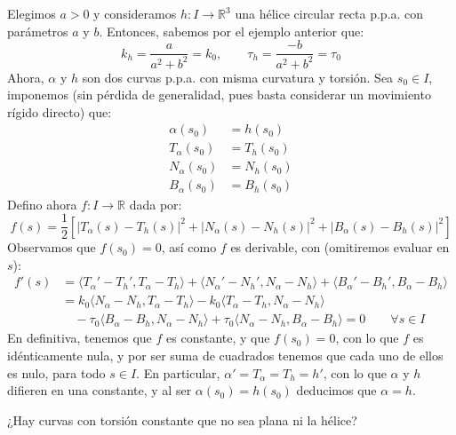 \begin{ejercicio}
    \noindent
    Elegimos $a>0$ y consideramos $h:I\to \mathbb{R}^3$ una hélice circular recta p.p.a. con parámetros $a$ y $b$. Entonces, sabemos por el ejemplo anterior que:
    \begin{equation*}
        k_h = \frac{a}{a^2+b^2} = k_0, \qquad \tau_h = \frac{-b}{a^2+b^2} = \tau_0
    \end{equation*}
    Ahora, $\alpha$ y $h$ son dos curvas p.p.a. con misma curvatura y torsión. Sea $s_0\in I$, imponemos (sin pérdida de generalidad, pues basta considerar un movimiento rígido directo) que:
    \begin{align*}
        \alpha(s_0) &= h(s_0) \\
        T_\alpha(s_0) &= T_h(s_0) \\
        N_\alpha(s_0) &= N_h(s_0) \\
        B_\alpha(s_0) &= B_h(s_0)
    \end{align*}
    Defino ahora $f:I\to \mathbb{R}$ dada por:
    \begin{equation*}
        f(s) = \frac{1}{2}\left[|T_\alpha(s)-T_h(s)|^2 + |N_\alpha(s)-N_h(s)|^2 + |B_\alpha(s)-B_h(s)|^2\right]
    \end{equation*}
    Observamos que $f(s_0) = 0$, así como $f$ es derivable, con (omitiremos evaluar en $s$):
    \begin{align*}
        f'(s) &= \langle T_\alpha'-T_h',T_\alpha-T_h \rangle  +\langle N_\alpha'-N_h',N_\alpha-N_h \rangle  + \langle B_\alpha'-B_h',B_\alpha-B_h \rangle   \\
              &= k_0 \langle N_\alpha-N_h,T_\alpha-T_h \rangle - k_0\langle T_\alpha-T_h,N_\alpha-N_h \rangle  \\
              &\quad  -\tau_0 \langle B_\alpha-B_h,N_\alpha-N_h \rangle + \tau_0 \langle N_\alpha-N_h,B_\alpha-B_h \rangle  = 0 \qquad \forall s\in I
    \end{align*}
    En definitiva, tenemos que $f$ es constante, y que $f(s_0) = 0$, con lo que $f$ es idénticamente nula, y por ser suma de cuadrados tenemos que cada uno de ellos es nulo, para todo $s\in I$. En particular, $\alpha' = T_\alpha = T_h = h'$, con lo que $\alpha$ y $h$ difieren en una constante, y al ser $\alpha(s_0) = h(s_0)$ deducimos que $\alpha = h$.
\end{ejercicio}

\begin{ejercicio}
    ¿Hay curvas con torsión constante que no sea plana ni la hélice?
\end{ejercicio}

